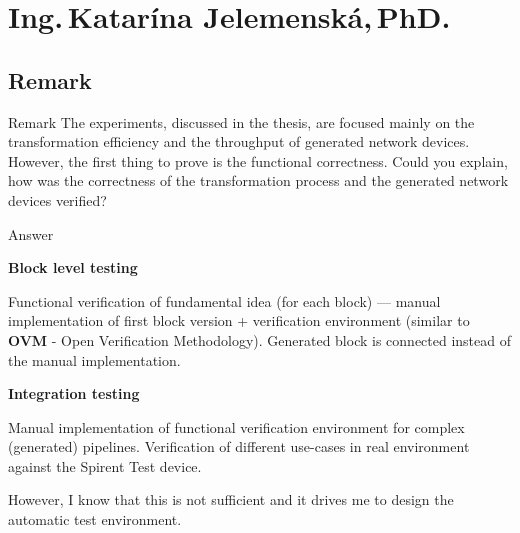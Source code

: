 \section{Ing.\,Katarína Jelemenská,\,PhD.}
\setcounter{RemarkCounter}{1}
\subsection{Remark \theRemarkCounter}
\begin{frame}[allowframebreaks]
    \begin{block}{Remark \theRemarkCounter}
        The experiments, discussed in the thesis, are focused mainly on the transformation efficiency
        and the throughput of generated network devices. However, the first thing to prove is the 
        functional correctness. Could you explain, how was the correctness of the transformation 
        process and the generated network devices verified?
    \end{block}
    
    \pagebreak
    
    \begin{exampleblock}{Answer}
        \begin{itemize}
            \fitem \textbf{Block level testing}
                \begin{enumerate}
                    \fitem Functional verification of fundamental idea (for each block) --- manual implementation of first block version + verification environment (similar to \textbf{OVM} - Open Verification Methodology).
                    \fitem Generated block is connected instead of the manual implementation.
                \end{enumerate}
            \fitem \textbf{Integration testing}
                \begin{enumerate}
                    \fitem Manual implementation of functional verification environment for complex (generated) pipelines.
                    \fitem Verification of different use-cases in real environment against the Spirent Test device.
                \end{enumerate}
        \end{itemize}
        
        However, I know that this is not sufficient and it drives me to design the automatic test environment.
    \end{exampleblock}
    

\end{frame}
